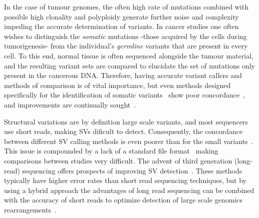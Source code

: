 \begin{justify}
In the case of tumour genomes, the often high rate of mutations combined with possible high clonality and polyploidy generate further noise and complexity impeding the accurate determination of variants. In cancer studies one often wishes to distinguish the \emph{somatic} mutations -those acquired by the cells during tumorigenesis- from the individual's \emph{germline} variants that are present in every cell. To this end, normal tissue is often sequenced alongside the tumour material, and the resulting variant sets are compared to elucidate the set of mutations only present in the cancerous DNA\@. Therefore, having accurate variant callers and methods of comparison is of vital importance, but even methods designed specifically for the identification of somatic variants~\cite{xu2014comparison,kim2013comparing,roberts2013comparative} show poor concordance~\cite{alioto2015comprehensive, kroigaard2016evaluation, orawe2013}, and improvements are continually sought~\cite{callari2017,vijayan2017}.

Structural variations are by definition large scale variants, and most sequencers use short reads, making SVs dificult to detect. Consequently, the concordance between different SV calling methods is even poorer than for the small variants~\cite{sedlazeck2017}. This issue is compounded by a lack of a standard file format~\cite{scherer2007} making comparisons between studies very difficult. The advent of third generation (long-read) sequencing offers prospects of improving SV detection~\cite{sedlazeck2018,merker2017}. These methods typically have higher error rates than short read sequencing techniques, but by using a hybrid approach the advantages of long read sequencing can be combined with the accuracy of short reads to optimize detection of large scale genomics rearrangements~\cite{fan2017hysa,weissensteiner2017, miller2017, ritz2014}.


\end{justify}
